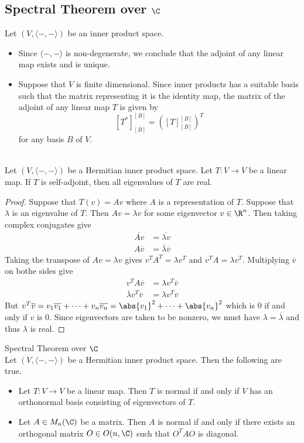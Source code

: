 \documentclass[a4paper]{article}
\begin{document}
\subsection{Spectral Theorem over $\C$}
Let $(V,\langle-,-\rangle)$ be an inner product space. 
\begin{itemize}
\item Since $\langle-,-\rangle$ is non-degenerate, we conclude that the adjoint of any linear map exists and is unique. 
\item Suppose that $V$ is finite dimensional. Since inner products has a suitable basis such that the matrix representing it is the identity map, the matrix of the adjoint of any linear map $T$ is given by $$[T^\ast]_{[B]}^{[B]}=\left([T]_{[B]}^{[B]}\right)^T$$ for any basis $B$ of $V$. 
\end{itemize}

\begin{prp}{}{}\\
Let $(V,\langle-,-\rangle)$ be a Hermitian inner product space. Let $T:V\to V$ be a linear map. If $T$ is self-adjoint, then all eigenvalues of $T$ are real. 
\begin{proof}
Suppose that $T(v)=Av$ where $A$ is a representation of $T$. Suppose that $\lambda$ is an eigenvalue of $T$. Then $Av=\lambda v$ for some eigenvector $v\in\R^n$. Then taking complex conjugates give 
\begin{align*}
\overline{Av}&=\overline{\lambda v}\\
A\overline{v}&=\overline{\lambda}\overline{v}
\end{align*}
Taking the transpose of $Av=\lambda v$ gives $v^TA^T=\lambda v^T$ and $v^TA=\lambda v^T$. Multiplying $\overline{v}$ on bothe sides give 
\begin{align*}
v^TA\overline{v}&=\lambda v^T\overline{v}\\
\overline{\lambda}v^T\overline{v}&=\lambda v^T\overline{v}
\end{align*}
But $v^T\overline{v}=v_1\overline{v_1}+\dots+v_n\overline{v_n}=\abs{v_1}^2+\dots+\abs{v_n}^2$ which is $0$ if and only if $v$ is $0$. Since eigenvectors are taken to be nonzero, we must have $\lambda=\overline{\lambda}$ and thus $\lambda$ is real. 
\end{proof}
\end{prp}

\begin{thm}{Spectral Theorem over $\C$}{}\\
Let $(V,\langle-,-\rangle)$ be a Hermitian inner product space. Then the following are true. 
\begin{itemize}
\item Let $T:V\to V$ be a linear map. Then $T$ is normal if and only if $V$ has an orthonormal basis consisting of eigenvectors of $T$. 
\item Let $A\in M_n(\C)$ be a matrix. Then $A$ is normal if and only if there exists an orthogonal matrix $O\in O(n,\C)$ such that $O^TAO$ is diagonal. 
\end{itemize}
\end{thm}
\end{document}
